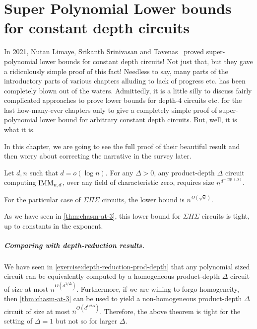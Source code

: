 \chapter{Super Polynomial Lower bounds for constant depth circuits}

In 2021, Nutan Limaye, Srikanth Srinivasan and \Sebastien Tavenas~\cite{LST25} proved super-polynomial lower bounds for constant depth circuits! Not just that, but they gave a ridiculously simple proof of this fact! Needless to say, many parts of the introductory parts of various chapters alluding to lack of progress etc. has been completely blown out of the waters. Admittedly, it is a little silly to discuss fairly complicated approaches to prove lower bounds for depth-$4$ circuits etc. for the last how-many-ever chapters only to give a completely simple proof of super-polynomial lower bound for arbitrary constant depth circuits. But, well, it is what it is. 

In this chapter, we are going to see the full proof of their beautiful result and then worry about correcting the narrative in the survey later. 

\begin{theorem} Let $d,n$ such that $d = o(\log n)$. For any $\Delta > 0$, any product-depth $\Delta$ circuit computing $\operatorname{\mathrm{IMM}}_{n,d}$, over any field of characteristic zero, requires size $n^{d^{-\exp(\Delta)}}$.

  For the particular case of $\Sigma\Pi\Sigma$ circuits, the lower bound is $n^{\Omega(\sqrt{d})}$. 
\end{theorem}

As we have seen in \autoref{thm:chasm-at-3}, this lower bound for $\Sigma\Pi\Sigma$ circuits is tight, up to constants in the exponent.

\paragraph{Comparing with depth-reduction results.} We have seen in \autoref{exercise:depth-reduction-prod-depth} that any polynomial sized circuit can be equivalently computed by a homogeneous product-depth $\Delta$ circuit of size at most $n^{O(d^{1/\Delta})}$. Furthermore, if we are willing to forgo homogeneity, then \autoref{thm:chasm-at-3} can be used to yield a non-homogeneous product-depth $\Delta$ circuit of size at most $n^{O(d^{1/2\Delta})}$. Therefore, the above theorem is tight for the setting of $\Delta = 1$ but not so for larger $\Delta$.

